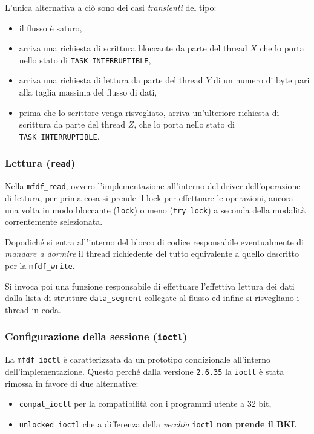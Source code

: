 \documentclass{article}
\begin{document}
L'unica alternativa a ciò sono dei casi \textit{transienti} del tipo:
\begin{itemize}
        \item il flusso è saturo,
        \item arriva una richiesta di scrittura bloccante da parte del thread $X$ che lo porta nello stato di \texttt{TASK\_INTERRUPTIBLE},
        \item arriva una richiesta di lettura da parte del thread $Y$ di un numero di byte pari alla taglia massima del flusso di dati,
        \item \ul{prima che lo scrittore venga risvegliato}, arriva un'ulteriore richiesta di scrittura da parte del thread $Z$, che lo porta nello stato di \texttt{TASK\_INTERRUPTIBLE}.
\end{itemize}

\subsubsection{Lettura (\texttt{read})}
Nella \texttt{mfdf\_read}, ovvero l'implementazione all'interno del driver dell'operazione di lettura, per prima cosa si prende il lock per effettuare le operazioni, ancora una volta in modo bloccante (\texttt{lock}) o meno (\texttt{try\_lock}) a seconda della modalità correntemente selezionata.

Dopodiché si entra all'interno del blocco di codice responsabile eventualmente di \textit{mandare a dormire} il thread richiedente del tutto equivalente a quello descritto per la \texttt{mfdf\_write}.

Si invoca poi una funzione responsabile di effettuare l'effettiva lettura dei dati dalla lista di strutture \texttt{data\_segment} collegate al flusso ed infine si risvegliano i thread in coda.
\subsubsection{Configurazione della sessione (\texttt{ioctl})}
La \texttt{mfdf\_ioctl} è caratterizzata da un prototipo condizionale all'interno dell'implementazione. Questo perché dalla versione \texttt{2.6.35} la \texttt{ioctl} è stata rimossa in favore di due alternative:
\begin{itemize}
        \item \texttt{compat\_ioctl} per la compatibilità con i programmi utente a 32 bit,
        \item \texttt{unlocked\_ioctl} che a differenza della \textit{vecchia} \texttt{ioctl} \textbf{non prende il BKL}
\end{itemize}
\end{document}
